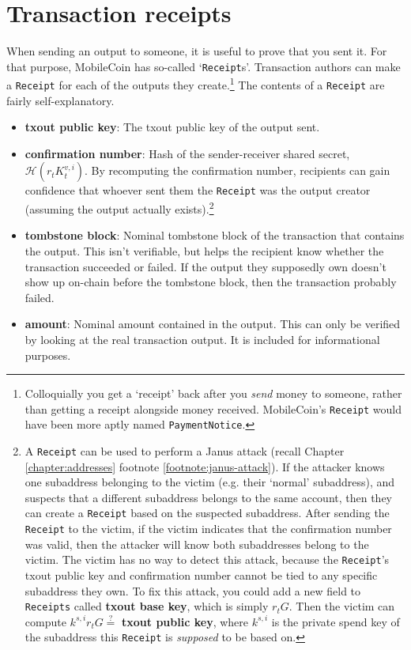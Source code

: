 \section{Transaction receipts}
\label{sec:transaction-receipts}

When sending an output to someone, it is useful to prove that you sent it. For that purpose, MobileCoin has so-called `{\tt Receipt}s'. Transaction authors can make a {\tt Receipt} for each of the outputs they create.\footnote{Colloquially you get a `receipt' back after you {\em send} money to someone, rather than getting a receipt alongside money received. MobileCoin's {\tt Receipt} would have been more aptly named {\tt PaymentNotice}.} The contents of a {\tt Receipt} are fairly self-explanatory.

\begin{itemize}
    \item \textbf{txout public key}: The txout public key of the output sent.

    \item \textbf{confirmation number}: Hash of the sender-receiver shared secret, $\mathcal{H}(r_t K^{v,i}_t)$. By recomputing the confirmation number, recipients can gain confidence that whoever sent them the {\tt Receipt} was the output creator (assuming the output actually exists).\footnote{A {\tt Receipt} can be used to perform a Janus attack (recall Chapter \ref{chapter:addresses} footnote \ref{footnote:janus-attack}). If the attacker knows one subaddress belonging to the victim (e.g. their `normal' subaddress), and suspects that a different subaddress belongs to the same account, then they can create a {\tt Receipt} based on the suspected subaddress. After sending the {\tt Receipt} to the victim, if the victim indicates that the confirmation number was valid, then the attacker will know both subaddresses belong to the victim. The victim has no way to detect this attack, because the {\tt Receipt}'s txout public key and confirmation number cannot be tied to any specific subaddress they own. To fix this attack, you could add a new field to {\tt Receipts} called \textbf{txout base key}, which is simply $r_t G$. Then the victim can compute $k^{s,i} r_t G \stackrel{?}{=}$ \textbf{txout public key}, where $k^{s,i}$ is the private spend key of the subaddress this {\tt Receipt} is {\em supposed} to be based on.}

    \item \textbf{tombstone block}: Nominal tombstone block of the transaction that contains the output. This isn't verifiable, but helps the recipient know whether the transaction succeeded or failed. If the output they supposedly own doesn't show up on-chain before the tombstone block, then the transaction probably failed.

    \item \textbf{amount}: Nominal amount contained in the output. This can only be verified by looking at the real transaction output. It is included for informational purposes.
\end{itemize}


